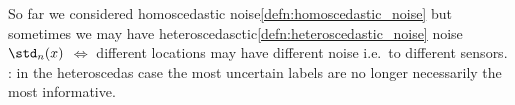 \begin{sectionbox}\nospacing
  So far we considered homoscedastic noise\cref{defn:homoscedastic_noise} but
  sometimes we may have heteroscedasctic\cref{defn:heteroscedastic_noise} noise
  $\std_{n}(x)$ $\iff$ different locations may have different noise i.e.\ to different sensors.\\
  : in the heteroscedas case the most uncertain labels are no longer necessarily the most informative.
\end{sectionbox}
